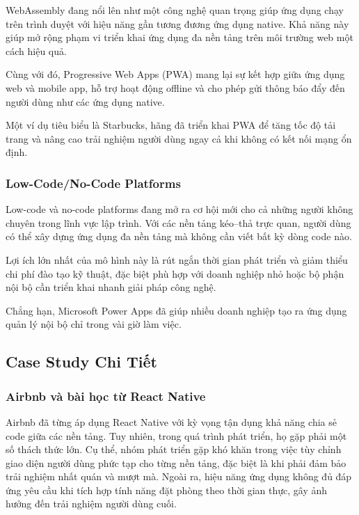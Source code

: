 WebAssembly đang nổi lên như một công nghệ quan trọng giúp ứng dụng chạy trên trình duyệt với hiệu năng gần tương đương ứng dụng native.  
Khả năng này giúp mở rộng phạm vi triển khai ứng dụng đa nền tảng trên môi trường web một cách hiệu quả.

\vspace{0.5em}

Cùng với đó, Progressive Web Apps (PWA) mang lại sự kết hợp giữa ứng dụng web và mobile app,  
hỗ trợ hoạt động offline và cho phép gửi thông báo đẩy đến người dùng như các ứng dụng native.

\vspace{0.5em}

Một ví dụ tiêu biểu là Starbucks, hãng đã triển khai PWA để tăng tốc độ tải trang và nâng cao trải nghiệm người dùng ngay cả khi không có kết nối mạng ổn định.


\subsubsection{Low-Code/No-Code Platforms}

Low-code và no-code platforms đang mở ra cơ hội mới cho cả những người không chuyên trong lĩnh vực lập trình. Với các nền tảng kéo–thả trực quan, người dùng có thể xây dựng ứng dụng đa nền tảng mà không cần viết bất kỳ dòng code nào.

\vspace{0.5em}

Lợi ích lớn nhất của mô hình này là rút ngắn thời gian phát triển và giảm thiểu chi phí đào tạo kỹ thuật, đặc biệt phù hợp với doanh nghiệp nhỏ hoặc bộ phận nội bộ cần triển khai nhanh giải pháp công nghệ.

\vspace{0.5em}

Chẳng hạn, Microsoft Power Apps đã giúp nhiều doanh nghiệp tạo ra ứng dụng quản lý nội bộ chỉ trong vài giờ làm việc.


\subsection{Case Study Chi Tiết}
\renewcommand{\labelitemi}{--}

\subsubsection{Airbnb và bài học từ React Native}

Airbnb đã từng áp dụng React Native với kỳ vọng tận dụng khả năng chia sẻ code giữa các nền tảng.  
Tuy nhiên, trong quá trình phát triển, họ gặp phải một số thách thức lớn. Cụ thể, nhóm phát triển gặp khó khăn trong việc tùy chỉnh giao diện người dùng phức tạp cho từng nền tảng, đặc biệt là khi phải đảm bảo trải nghiệm nhất quán và mượt mà. Ngoài ra, hiệu năng ứng dụng không đủ đáp ứng yêu cầu khi tích hợp tính năng đặt phòng theo thời gian thực, gây ảnh hưởng đến trải nghiệm người dùng cuối.


